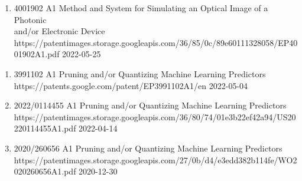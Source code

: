 {
    \ifdefined\shortcv
        {}
    \else
        {
            \begin{enumerate}
                \item [] 
                                        {4001902 A1}
                                        {Method and System for Simulating an Optical Image of a Photonic \\ and/or Electronic Device}
                                        {https://patentimages.storage.googleapis.com/36/85/0c/89e60111328058/EP4001902A1.pdf}
                                        {2022-05-25}
            \end{enumerate}
        }
    \fi
}


{
    \ifdefined\shortcv
        {}
    \else
        {
            \begin{enumerate}
                \item [] 
                                        {3991102 A1}
                                        {Pruning and/or Quantizing Machine Learning Predictors}
                                        {https://patents.google.com/patent/EP3991102A1/en}
                                        {2022-05-04}
                \item [] 
                                        {2022/0114455 A1}
                                        {Pruning and/or Quantizing Machine Learning Predictors}
                                        {https://patentimages.storage.googleapis.com/36/80/74/01e3b22ef42a94/US20220114455A1.pdf}
                                        {2022-04-14}
                \item [] 
                                        {2020/260656 A1}
                                        {Pruning and/or Quantizing Machine Learning Predictors}
                                        {https://patentimages.storage.googleapis.com/27/0b/d4/e3edd382b114fe/WO2020260656A1.pdf}
                                        {2020-12-30}
            \end{enumerate}
        }
    \fi
}


